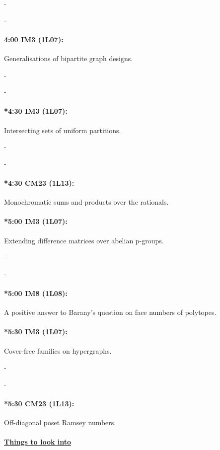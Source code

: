\documentclass[12]{article}
\theoremstyle{definition}
\begin{document}
	-
	
	-
	
	\paragraph{4:00 IM3 (1L07):} Generalisations of bipartite graph designs.
	
	-
	
	-
	
	\paragraph{*4:30 IM3 (1L07):} Intersecting sets of uniform partitions.
	
	-
	
	-
	
	\paragraph{*4:30 CM23 (1L13):} Monochromatic sums and products over the rationals.
	
	\paragraph{*5:00 IM3 (1L07):} Extending difference matrices over abelian p-groups.
	
	-
	
	-
	
	\paragraph{*5:00 IM8 (1L08):} A positive answer to Barany's question on face numbers of polytopes.
	
	\paragraph{*5:30 IM3 (1L07):} Cover-free families on hypergraphs.
	
	-
	
	-
	
	\paragraph{*5:30 CM23 (1L13):} Off-diagonal poset Ramsey numbers.
	
	\begin{center} 
		\item\paragraph{\underline{Things to look into}} 
	\end{center}

	
\end{document}
